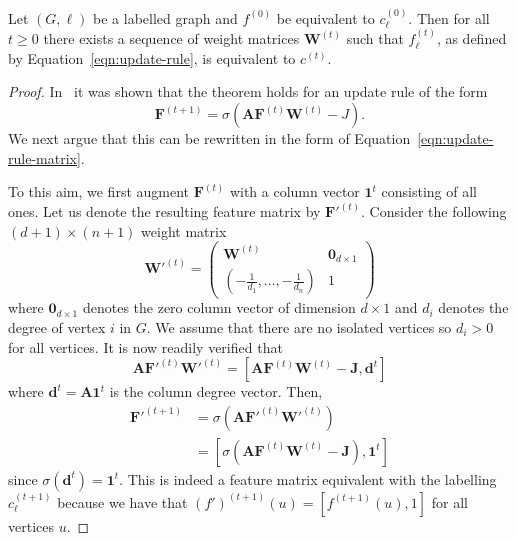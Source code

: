 \begin{theorem}\label{thm:simpler-grohe}
    Let $(G,\ell)$ be a labelled graph and $f^{(0)}$ be equivalent
    to $c_\ell^{(0)}$. Then for all $t \geq 0$
    there exists a sequence of weight matrices $\mathbf{W}^{(t)}$ such that
    $f^{(t)}_\ell$, as defined by Equation~\eqref{eqn:update-rule}, is equivalent
    to $c^{(t)}$.
\end{theorem}
\begin{proof}
In~\cite[Theorem 2]{grohewl} it was shown
that the theorem holds for an update rule of
the form 
\[
    \mathbf{F}^{(t+1)} = \sigma\left(\mathbf{AF}^{(t)}\mathbf{W}^{(t)}-J\right).
\]
We next argue that this can be rewritten in the form of Equation~\eqref{eqn:update-rule-matrix}.


To this aim, we first augment $\mathbf{F}^{(t)}$ with a
column
vector $\mathbf{1}^{t}$ consisting of all ones.
Let us denote the resulting feature matrix by
$\mathbf{F'}^{(t)}$.
Consider the following $(d+1)\times (n+1)$ weight matrix
\[
    \mathbf{W'}^{(t)}=\begin{pmatrix}
    \mathbf{W}^{(t)} & \mathbf{0}_{d\times 1}\\
    \left(-\frac{1}{d_1},\ldots,-\frac{1}{d_n}\right) & 1
    \end{pmatrix}
\]
where $\mathbf{0}_{d\times 1}$ denotes the zero column vector of dimension $d\times 1$ and $d_i$ denotes the degree of vertex $i$ in $G$. 
We assume that there are no isolated vertices so $d_i> 0$ for all vertices.
It is now readily verified that
$$
    \mathbf{A}\mathbf{F'}^{(t)}\mathbf{W'}^{(t)}=
    [\mathbf{A}\mathbf{F}^{(t)}\mathbf{W}^{(t)}-\mathbf{J},\mathbf{d}^t]
$$
where $\mathbf{d}^t=\mathbf{A}\mathbf{1}^t$ is the column degree vector. 
Then,
\begin{align*}
    \mathbf{F'}^{(t+1)} &=
    \sigma(
    \mathbf{A}\mathbf{F'}^{(t)}\mathbf{W'}^{(t)}
    )\\
    & =
    [\sigma(\mathbf{A}\mathbf{F}^{(t)}\mathbf{W}^{(t)}-
    \mathbf{J}),\mathbf{1}^t]
\end{align*}
since $\sigma(\mathbf{d}^t)=\mathbf{1}^t$. This is indeed a feature matrix equivalent with the labelling $c_\ell^{(t+1)}$ because we have that $(f')^{(t+1)}(u)=[f^{(t+1)}(u),1]$
for all vertices $u$.
\end{proof}